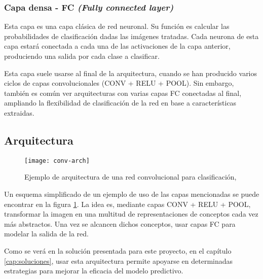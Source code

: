 \subsubsection{Capa densa - FC \textit{(Fully connected layer)}}

Esta capa es una capa clásica de red neuronal. Su función es calcular las probabilidades de clasificación dadas las imágenes tratadas. Cada neurona de esta capa estará conectada a cada una de las activaciones de la capa anterior, produciendo una salida por cada clase a clasificar.

Esta capa suele usarse al final de la arquitectura, cuando se han producido varios ciclos de capas convolucionales (CONV + RELU + POOL). Sin embargo, también es común ver arquitecturas con varias capas FC conectadas al final, ampliando la flexibilidad de clasificación de la red en base a características extraidas.

\subsection{Arquitectura}
\label{sec:conv-net-arch}

\begin{figure}
    \centering
    \caption{Ejemplo de arquitectura de una red convolucional para clasificación, \parencite{clarifai}}
\label{conv-arch}
  \texttt{[image: conv-arch]}
\end{figure}

Un esquema simplificado de un ejemplo de uso de las capas mencionadas se puede encontrar en la figura \ref{conv-arch}. La idea es, mediante capas CONV + RELU + POOL, transformar la imagen en una multitud de representaciones de conceptos cada vez más abstractos. Una vez se alcancen dichos conceptos, usar capas FC para modelar la salida de la red.

Como se verá en la solución presentada para este proyecto, en el capítulo \ref{cap:soluciones}, usar esta arquitectura permite apoyarse en determinadas estrategias para mejorar la eficacia del modelo predictivo.
